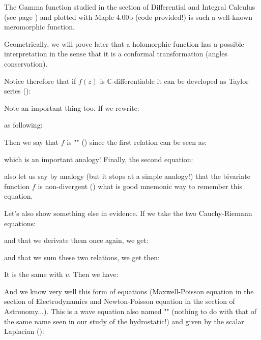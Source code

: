 	The Gamma function studied in the section of Differential and Integral Calculus (see page \pageref{gamma euler function}) and plotted with Maple 4.00b (code provided!) is such a well-known meromorphic function.
	
	\begin{tcolorbox}[title=Remark,arc=10pt,breakable,drop lifted shadow,
  skin=enhanced,
  skin first is subskin of={enhancedfirst}{arc=10pt,no shadow},
  skin middle is subskin of={enhancedmiddle}{arc=10pt,no shadow},
  skin last is subskin of={enhancedlast}{drop lifted shadow}]
	Geometrically, we will prove later that a holomorphic function has a possible interpretation in the sense that it is a conformal transformation (angles conservation).
	\end{tcolorbox}
	
	Notice therefore that if $f (z)$ is $\mathbb{C}$-differentiable it can be developed as Taylor series ():
	
	Note an important thing too. If we rewrite:
	
	as following:
	
	Then we say that $f$ is "" () since the first relation can be seen as:
	
	which is an important analogy! Finally, the second equation:
	
	also let us say by analogy (but it stops at a simple analogy!) that the bivariate function $f$ is non-divergent () what is good mnemonic way to remember this equation.
	
	Let's also show something else in evidence. If we take the two Cauchy-Riemann equations:
	
	and that we derivate them once again, we get:
	
	and that we sum these two relations, we get then:
	
	It is the same with $v$. Then we have:
	
	And we know very well this form of equations (Maxwell-Poisson equation in the section of Electrodynamics and Newton-Poisson equation in the section of Astronomy...). This is a wave equation also named "" (nothing to do with that of the same name seen in our study of the hydrostatic!) and given by the scalar Laplacian ():
	
